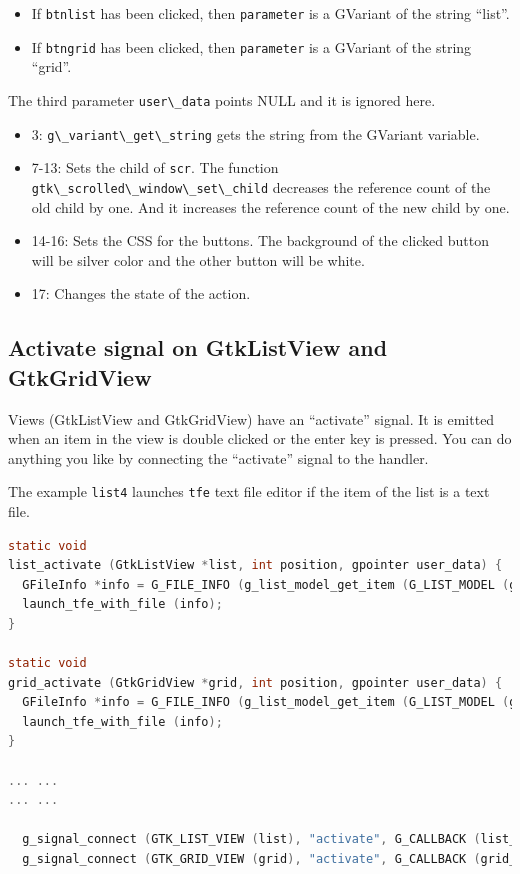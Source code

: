 \begin{itemize}
\tightlist
\item
  If \passthrough{\lstinline!btnlist!} has been clicked, then
  \passthrough{\lstinline!parameter!} is a GVariant of the string
  ``list''.
\item
  If \passthrough{\lstinline!btngrid!} has been clicked, then
  \passthrough{\lstinline!parameter!} is a GVariant of the string
  ``grid''.
\end{itemize}

The third parameter \passthrough{\lstinline!user\_data!} points NULL and
it is ignored here.

\begin{itemize}
\tightlist
\item
  3: \passthrough{\lstinline!g\_variant\_get\_string!} gets the string
  from the GVariant variable.
\item
  7-13: Sets the child of \passthrough{\lstinline!scr!}. The function
  \passthrough{\lstinline!gtk\_scrolled\_window\_set\_child!} decreases
  the reference count of the old child by one. And it increases the
  reference count of the new child by one.
\item
  14-16: Sets the CSS for the buttons. The background of the clicked
  button will be silver color and the other button will be white.
\item
  17: Changes the state of the action.
\end{itemize}

\subsection{Activate signal on GtkListView and
GtkGridView}\label{activate-signal-on-gtklistview-and-gtkgridview}

Views (GtkListView and GtkGridView) have an ``activate'' signal. It is
emitted when an item in the view is double clicked or the enter key is
pressed. You can do anything you like by connecting the ``activate''
signal to the handler.

The example \passthrough{\lstinline!list4!} launches
\passthrough{\lstinline!tfe!} text file editor if the item of the list
is a text file.

\begin{lstlisting}[language=C]
static void
list_activate (GtkListView *list, int position, gpointer user_data) {
  GFileInfo *info = G_FILE_INFO (g_list_model_get_item (G_LIST_MODEL (gtk_list_view_get_model (list)), position));
  launch_tfe_with_file (info);
}

static void
grid_activate (GtkGridView *grid, int position, gpointer user_data) {
  GFileInfo *info = G_FILE_INFO (g_list_model_get_item (G_LIST_MODEL (gtk_grid_view_get_model (grid)), position));
  launch_tfe_with_file (info);
}

... ...
... ...

  g_signal_connect (GTK_LIST_VIEW (list), "activate", G_CALLBACK (list_activate), NULL);
  g_signal_connect (GTK_GRID_VIEW (grid), "activate", G_CALLBACK (grid_activate), NULL);
\end{lstlisting}

